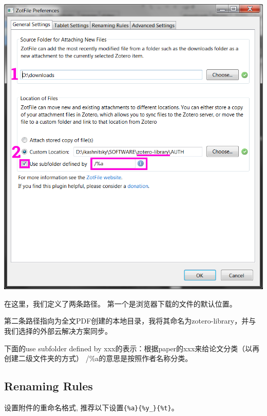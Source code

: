 \documentclass[
  letterpaper,
  DIV=11,
  numbers=noendperiod,
  oneside]{scrreprt}
\begin{document}
\includegraphics{./images/zotero_zotfile.png}

在这里，我们定义了两条路径。 第一个是浏览器下载的文件的默认位置。

第二条路径指向为全文PDF创建的本地目录，我将其命名为zotero-library，并与我们选择的外部云解决方案同步。

下面的use subfolder defined by
xxx的表示：根据paper的xxx来给论文分类（以再创建二级文件夹的方式）
/\%a的意思是按照作者名称分类。

\hypertarget{renaming-rules}{%
\subsection{Renaming Rules}\label{renaming-rules}}

设置附件的重命名格式, 推荐以下设置\texttt{\{\%a\}\{\%y\_\}\{\%t\}}。
\end{document}
